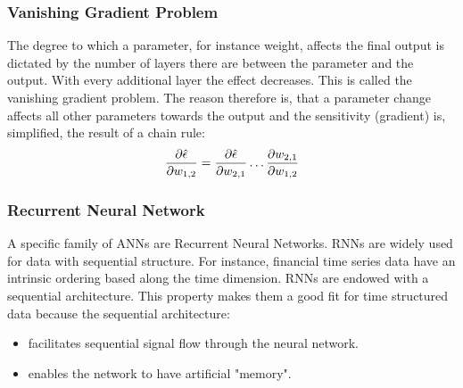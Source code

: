 \documentclass[xcolor=dvipsnames, english, 8pt]{beamer}
\begin{document}
\begin{frame}
    \frametitle{Vanishing Gradient Problem}

The degree to which a parameter, for instance weight, affects the final output is dictated by the number of layers there are between the parameter and the output. With every additional layer the effect decreases. This is called the {\color{ubRed} vanishing gradient problem}. The reason therefore is, that a parameter change affects all other parameters towards the output and the sensitivity (gradient) is, simplified, the result of a chain rule:
\begin{align}
    \frac{\partial \hat{\epsilon}}{\partial w_{1,2}}= \frac{\partial \hat{\epsilon}}{\partial w_{2,1}} \hdots \frac{\partial w_{2,1}}{\partial w_{1,2}}\vspace{0.5cm}\\
\end{align}

    \begin{center}
\end{center}

\end{frame}

\begin{frame}
    \frametitle{Recurrent Neural Network}
    A specific family of ANNs are Recurrent Neural Networks. RNNs are widely used for data with sequential structure. For instance, financial time series data have an intrinsic ordering based along the time dimension. RNNs are endowed with a sequential architecture. This property makes them a good fit for time structured data because the sequential architecture:\vspace{0.25cm}\\
    \begin{itemize}
        \item facilitates sequential signal flow through the neural network.
        \item enables the network to have artificial "memory".
    \end{itemize}
\end{frame}
\end{document}
